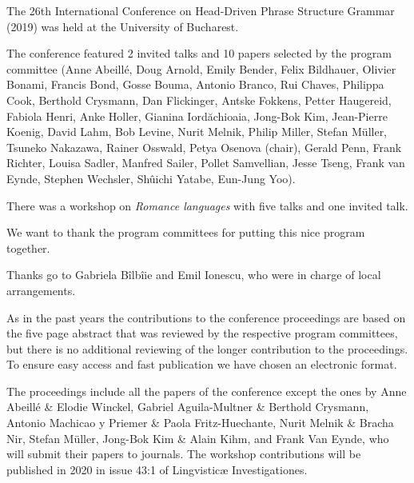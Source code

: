 The 26th International Conference on Head-Driven Phrase Structure Grammar (2019) was held at
the University of Bucharest.

The conference featured 2 invited talks and 10 papers selected by the program committee 
(Anne Abeillé, 
Doug Arnold, 
Emily Bender, 
Felix Bildhauer, 
Olivier Bonami, 
Francis Bond, 
Gosse Bouma, 
Antonio Branco, 
Rui Chaves, 
Philippa Cook, 
Berthold Crysmann, 
Dan Flickinger, 
Antske Fokkens, 
Petter Haugereid, 
Fabiola Henri, 
Anke Holler, 
Gianina Iordăchioaia, 
Jong-Bok Kim, 
Jean-Pierre Koenig, 
David Lahm, 
Bob Levine, 
Nurit Melnik, 
Philip Miller, 
Stefan Müller, 
Tsuneko Nakazawa, 
Rainer Osswald, 
Petya Osenova (chair), 
Gerald Penn, 
Frank Richter, 
Louisa Sadler, 
Manfred Sailer, 
Pollet Samvellian, 
Jesse Tseng, 
Frank van Eynde, 
Stephen Wechsler, 
Shûichi Yatabe, 
Eun-Jung Yoo).

There was a workshop on \emph{Romance languages} with five talks and one
invited talk.

We want to thank the program committees for putting this nice program together.

Thanks go to Gabriela Bîlbîie and Emil Ionescu, who were in charge of local
arrangements.
 

As in the past years the contributions to the conference proceedings are based on the five page abstract
that was reviewed by the respective program committees, but there is no additional reviewing of the
longer contribution to the proceedings. To ensure easy access and fast publication we have chosen an electronic format.

The proceedings include all the papers of the conference except the ones by 
Anne Abeillé \& Elodie Winckel, 
Gabriel Aguila-Multner \& Berthold Crysmann,
Antonio Machicao y Priemer \& Paola Fritz-Huechante, 
Nurit Melnik \& Bracha Nir, 
Stefan Müller, Jong-Bok Kim \& Alain Kihm, and Frank Van Eynde, 
who will submit their papers to journals. The
workshop contributions will be published in 2020 in issue 43:1 of Lingvisticæ Investigationes.


